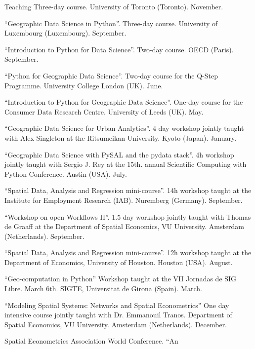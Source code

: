 \documentclass[12pt,2up]{article}
\begin{document}
\begin{cv}{}
\begin{cvlist}{Teaching}
        Three-day course. University of Toronto
        (Toronto). November.
    \item[] ``Geographic Data Science in Python''.
        Three-day course. University of Luxembourg
        (Luxembourg). September.
    \item[] ``Introduction to Python for Data Science''.
        Two-day course. OECD
        (Paris). September.
    \item[] ``Python for Geographic Data Science''.
        Two-day course for the Q-Step Programme. University College London
        (UK). June.
    \item[] ``Introduction to Python for Geographic Data Science''.
        One-day course for the Consumer Data Research Centre. University of
        Leeds (UK). May.
    \item[2017] ``Geographic Data Science for Urban Analytics''.
        4 day workshop jointly taught with Alex Singleton at the Ritsumeikan
        University. Kyoto (Japan). January.
    \item[2016] ``Geographic Data Science with PySAL and the pydata stack''.
        4h workshop jointly taught with Sergio J. Rey at the 15th. annual
        Scientific Computing with Python Conference. Austin (USA). July.
    \item[2014] ``Spatial Data, Analysis and Regression mini-course''. 14h workshop taught
        at the Institute for Employment Research (IAB). Nuremberg (Germany).
        September.
    \item[] ``Workshop on open Workflows II''. 1.5 day workshop jointly taught
        with Thomas de Graaff at the Department of Spatial Economics, VU
        University. Amsterdam (Netherlands). September.
    \item[] ``Spatial Data, Analysis and Regression mini-course''. 12h workshop taught
        at the Department of Economics, University of Houston. Houston (USA).
        August.
    \item[2013] ``Geo-computation in Python''
        Workshop taught at the VII Jornadas de SIG Libre. March 6th.
        SIGTE, Universitat de Girona (Spain).
        March.
    \item[2012] ``Modeling Spatial Systems: Networks and Spatial Econometrics''
        One day intensive course jointly taught with Dr. Emmanouil Tranos.
        Department of Spatial Economics, VU University. Amsterdam (Netherlands).
        December.
    \item[] Spatial Econometrics Association World Conference. ``An

\end{cvlist}
\end{cv}
\end{document}
